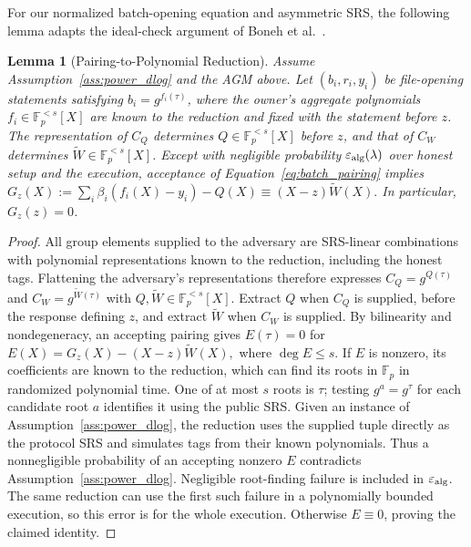 \documentclass[lettersize,journal]{IEEEtran}
\newtheorem{lemma}{Lemma}
\newcommand{\FF}{\mathbb{F}}
\begin{document}
For our normalized batch-opening equation and asymmetric SRS, the following lemma adapts the ideal-check argument of Boneh et al.~\cite[Lem.~2.2 and Sec.~4]{Boneh2020PCS}.

\begin{lemma}[Pairing-to-Polynomial Reduction]\label{lem:pairing_reduction}
Assume Assumption~\ref{ass:power_dlog} and the AGM above. Let $(b_i,r_i,y_i)$ be file-opening statements satisfying $b_i=g^{f_i(\tau)}$, where the owner's aggregate polynomials $f_i\in\FF_p^{<s}[X]$ are known to the reduction and fixed with the statement before $z$. The representation of $C_Q$ determines $Q\in\FF_p^{<s}[X]$ before $z$, and that of $C_W$ determines $\widetilde W\in\FF_p^{<s}[X]$. Except with negligible probability $\varepsilon_{\rm alg}(\lambda)$ over honest setup and the execution, acceptance of Equation~\eqref{eq:batch_pairing} implies
$G_z(X):=\sum_i\beta_i(f_i(X)-y_i)-Q(X) \equiv (X-z)\widetilde W(X).$
In particular, $G_z(z)=0$.
\end{lemma}
\begin{proof}
All group elements supplied to the adversary are SRS-linear combinations with polynomial representations known to the reduction, including the honest tags. Flattening the adversary's representations therefore expresses $C_Q=g^{Q(\tau)}$ and $C_W=g^{\widetilde W(\tau)}$ with $Q,\widetilde W\in\FF_p^{<s}[X]$. Extract $Q$ when $C_Q$ is supplied, before the response defining $z$, and extract $\widetilde W$ when $C_W$ is supplied. By bilinearity and nondegeneracy, an accepting pairing gives $E(\tau)=0$ for $E(X)=G_z(X)-(X-z)\widetilde W(X),$
where $\deg E\leq s$. If $E$ is nonzero, its coefficients are known to the reduction, which can find its roots in $\FF_p$ in randomized polynomial time. One of at most $s$ roots is $\tau$; testing $g^a=g^\tau$ for each candidate root $a$ identifies it using the public SRS. Given an instance of Assumption~\ref{ass:power_dlog}, the reduction uses the supplied tuple directly as the protocol SRS and simulates tags from their known polynomials. Thus a nonnegligible probability of an accepting nonzero $E$ contradicts Assumption~\ref{ass:power_dlog}. Negligible root-finding failure is included in $\varepsilon_{\rm alg}$. The same reduction can use the first such failure in a polynomially bounded execution, so this error is for the whole execution. Otherwise $E\equiv0$, proving the claimed identity.
\end{proof}
\end{document}
